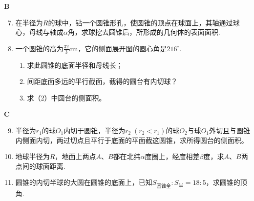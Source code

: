 \begin{center}
    \bfseries B
\end{center}
\begin{enumerate}\setcounter{enumi}{6}
\item 在半径为$R$的球中，钻一个圆锥形孔，使圆锥的顶点在球面上，其轴通过球心，母线与轴成$\alpha$角，求球挖去圆锥后，所形成的几何体的表面面积.
\item 一个圆锥的高为$\frac{32}{3}$cm，它的侧面展开图的圆心角是$216^{\circ}$.
\begin{enumerate}[(1)]
\item 求此圆锥的底面半径和母线长；
\item 间距底面多远的平行截面，截得的圆台有内切球？
\item 求（2）中圆台的侧面积。
\end{enumerate}
\end{enumerate}

\begin{center}
    \bfseries C
\end{center}
\begin{enumerate}\setcounter{enumi}{8}
\item 半径为$r_1$的球$O_1$内切于圆锥，半径为$r_2\; (r_2<r_1)$的球$O_2$与球$O_1$外切且与圆锥内侧面内切，两过切点且平行于底面的平面截这圆锥，求所得圆台的侧面积。
\item 地球半径为$R$，地面上两点$A$、$B$都在北纬$\alpha$度圈上，经度相差$\beta$度，求$A$、$B$两点间的球面距离.
\item 圆锥的内切半球的大圆在圆锥的底面上，已知$S_{\text{圆锥全}}:S_{\text{半}}=18:5$，求圆锥的顶角.   
\end{enumerate}


